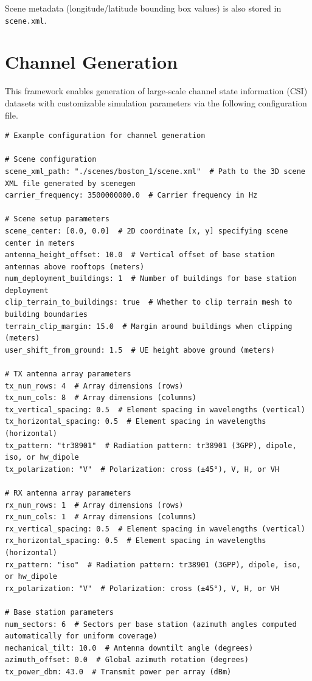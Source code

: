 \documentclass{article}
\begin{document}
Scene metadata (longitude/latitude bounding box values) is also stored in \texttt{scene.xml}.

\clearpage

\section{Channel Generation}
This framework enables generation of large-scale channel state information (CSI) datasets with customizable simulation parameters via the following configuration file.

\begin{verbatim}
# Example configuration for channel generation

# Scene configuration
scene_xml_path: "./scenes/boston_1/scene.xml"  # Path to the 3D scene XML file generated by scenegen
carrier_frequency: 3500000000.0  # Carrier frequency in Hz

# Scene setup parameters
scene_center: [0.0, 0.0]  # 2D coordinate [x, y] specifying scene center in meters
antenna_height_offset: 10.0  # Vertical offset of base station antennas above rooftops (meters)
num_deployment_buildings: 1  # Number of buildings for base station deployment
clip_terrain_to_buildings: true  # Whether to clip terrain mesh to building boundaries
terrain_clip_margin: 15.0  # Margin around buildings when clipping (meters)
user_shift_from_ground: 1.5  # UE height above ground (meters)

# TX antenna array parameters
tx_num_rows: 4  # Array dimensions (rows)
tx_num_cols: 8  # Array dimensions (columns)
tx_vertical_spacing: 0.5  # Element spacing in wavelengths (vertical)
tx_horizontal_spacing: 0.5  # Element spacing in wavelengths (horizontal)
tx_pattern: "tr38901"  # Radiation pattern: tr38901 (3GPP), dipole, iso, or hw_dipole
tx_polarization: "V"  # Polarization: cross (±45°), V, H, or VH

# RX antenna array parameters
rx_num_rows: 1  # Array dimensions (rows)
rx_num_cols: 1  # Array dimensions (columns)
rx_vertical_spacing: 0.5  # Element spacing in wavelengths (vertical)
rx_horizontal_spacing: 0.5  # Element spacing in wavelengths (horizontal)
rx_pattern: "iso"  # Radiation pattern: tr38901 (3GPP), dipole, iso, or hw_dipole
rx_polarization: "V"  # Polarization: cross (±45°), V, H, or VH

# Base station parameters
num_sectors: 6  # Sectors per base station (azimuth angles computed automatically for uniform coverage)
mechanical_tilt: 10.0  # Antenna downtilt angle (degrees)
azimuth_offset: 0.0  # Global azimuth rotation (degrees)
tx_power_dbm: 43.0  # Transmit power per array (dBm)


\end{verbatim}
\end{document}
